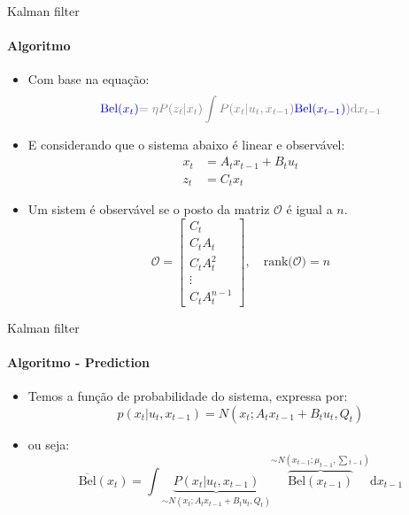 \documentclass{beamer}
\begin{document}
\begin{frame}[c]{Kalman filter}
    \framesubtitle{Algoritmo}
    \begin{itemize}
        \item Com base na equação:
        \begin{equation*}
            \color{blue}{\text{Bel}}(x_t)  \color{gray}{=\eta P(z_t|x_t)\displaystyle\int P(x_t| u_t,x_{t-1})}\color{blue}{\color{blue}{\text{Bel}}(x_{t-1})}\color{gray}{)\text{d}x_{t-1}}
        \end{equation*}
        \item E considerando que o sistema abaixo é linear e observável:
        \begin{equation*}
            \begin{split}
                x_t &= A_t x_{t-1} + B_t u_t\\ 
                z_t &= C_t x_t
            \end{split}
        \end{equation*}
        \item Um sistem é observável se o posto da matriz $\mathcal {O}$ é igual a $n$.
        \begin{equation*}
            \mathcal {O}={\begin{bmatrix}C_t\\C_tA_t\\C_tA^{2}_t\\\vdots \\C_tA^{n-1}_t\end{bmatrix}, \quad \text{rank}(\mathcal {O}}) = n
        \end{equation*}
    \end{itemize}
\end{frame}


\begin{frame}[c]{Kalman filter}
    \framesubtitle{Algoritmo - Prediction}
    \begin{itemize}
        \item Temos a função de probabilidade do sistema, expressa por:
        \begin{equation*}
            p(x_t| u_t, x_{t-1})= N\left(x_t; A_tx_{t-1}+ B_tu_t, Q_t\right)
        \end{equation*}   
        \item ou seja:
        \begin{equation*}
            \overline{\text{Bel}}(x_t)  = \displaystyle\int\underbrace{P(x_t|u_t, x_{t-1})}_{\sim N\left(x_t; A_t x_{t-1}+ B_tu_t, Q_t\right)} \overbrace{\text{Bel}(x_{t-1})}^{\sim N\left(x_{t-1}; \mu_{t-1}, \textstyle\sum {}_{t-1}\right)}\text{d}x_{t-1}
        \end{equation*}
    \end{itemize}
\end{frame}
\end{document}
